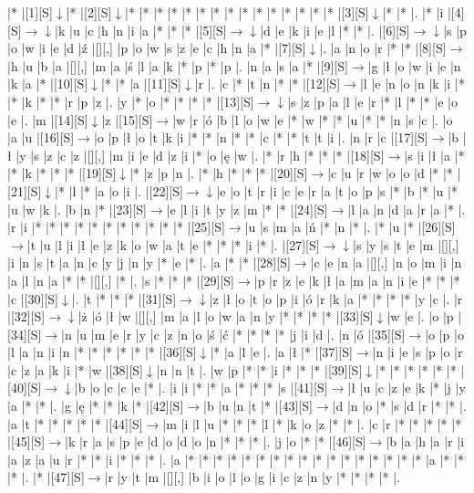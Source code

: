 \documentclass[11pt]{article}
\newcommand\drarr{$\rightarrow \!\!\!\!\! \downarrow$}
\newcommand\rarr{$\rightarrow$}
\newcommand\darr{$\downarrow$}
\begin{document}
\noindent\begin{Puzzle}{21}{31}|*	|[1][S]\darr	|*	|[2][S]\darr	|*	|*	|*	|*	|*	|*	|*	|*	|*	|*	|*	|*	|*	|*	|*	|[3][S]\darr	|*	|*	|.
|*	|i	|[4][S]\drarr	|k	|u	|c	|h	|n	|i	|a	|*	|*	|*	|[5][S]\drarr	|d	|e	|k	|i	|e	|l	|*	|*	|.
|[6][S]\drarr	|s	|p	|o	|w	|i	|e	|d	|ź	|[][,]{ }	|p	|o	|w	|s	|z	|e	|c	|h	|n	|a	|*	|[7][S]\darr	|.
|a	|n	|o	|r	|*	|*	|[8][S]\rarr	|h	|u	|b	|a	|[][,]{ }	|m	|a	|ś	|l	|a	|k	|*	|p	|*	|p	|.
|n	|a	|s	|a	|*	|[9][S]\rarr	|g	|ł	|o	|w	|i	|e	|n	|k	|a	|*	|[10][S]\darr	|*	|*	|a	|[11][S]\darr	|r	|.
|c	|*	|t	|n	|*	|*	|[12][S]\rarr	|l	|e	|n	|o	|n	|k	|i	|*	|*	|k	|*	|*	|r	|p	|z	|.
|y	|*	|o	|*	|*	|*	|*	|[13][S]\drarr	|s	|z	|p	|a	|l	|e	|r	|*	|l	|*	|*	|e	|o	|e	|.
|m	|[14][S]\darr	|z	|[15][S]\rarr	|w	|r	|ó	|b	|l	|o	|w	|e	|*	|w	|*	|*	|u	|*	|*	|n	|s	|c	|.
|o	|a	|u	|[16][S]\rarr	|o	|p	|ł	|o	|t	|k	|i	|*	|*	|n	|*	|*	|c	|*	|*	|t	|t	|i	|.
|n	|r	|c	|[17][S]\rarr	|b	|ł	|y	|s	|z	|c	|z	|[][,]{ }	|m	|i	|e	|d	|z	|i	|*	|o	|ę	|w	|.
|*	|r	|h	|*	|*	|*	|[18][S]\rarr	|s	|i	|ł	|a	|*	|*	|k	|*	|*	|*	|[19][S]\darr	|*	|z	|p	|n	|.
|*	|h	|*	|*	|*	|[20][S]\rarr	|c	|u	|r	|w	|o	|o	|d	|*	|*	|[21][S]\darr	|*	|l	|*	|a	|o	|i	|.
|[22][S]\drarr	|e	|o	|t	|r	|i	|c	|e	|r	|a	|t	|o	|p	|s	|*	|b	|*	|u	|*	|u	|w	|k	|.
|b	|n	|*	|[23][S]\rarr	|e	|l	|i	|t	|y	|z	|m	|*	|*	|[24][S]\rarr	|l	|a	|n	|d	|a	|r	|a	|*	|.
|r	|i	|*	|*	|*	|*	|*	|*	|*	|*	|*	|*	|*	|[25][S]\rarr	|u	|s	|m	|a	|ń	|*	|n	|*	|.
|*	|u	|*	|[26][S]\rarr	|t	|u	|l	|i	|ł	|e	|z	|k	|o	|w	|a	|t	|e	|*	|*	|*	|i	|*	|.
|[27][S]\drarr	|s	|y	|s	|t	|e	|m	|[][,]{ }	|i	|n	|s	|t	|a	|n	|c	|y	|j	|n	|y	|*	|e	|*	|.
|a	|*	|*	|[28][S]\rarr	|c	|e	|n	|a	|[][,]{ }	|n	|o	|m	|i	|n	|a	|l	|n	|a	|*	|*	|[][,]{ }	|*	|.
|s	|*	|*	|*	|[29][S]\rarr	|p	|r	|z	|e	|k	|ł	|a	|m	|a	|n	|i	|e	|*	|*	|*	|c	|[30][S]\darr	|.
|t	|*	|*	|*	|[31][S]\drarr	|z	|ł	|o	|t	|o	|p	|i	|ó	|r	|k	|a	|*	|*	|*	|*	|y	|c	|.
|r	|[32][S]\drarr	|ż	|ó	|ł	|w	|[][,]{ }	|m	|a	|l	|o	|w	|a	|n	|y	|*	|*	|*	|*	|[33][S]\darr	|w	|e	|.
|o	|p	|[34][S]\rarr	|n	|u	|m	|e	|r	|y	|c	|z	|n	|o	|ś	|ć	|*	|*	|*	|*	|j	|i	|d	|.
|n	|ó	|[35][S]\rarr	|o	|p	|o	|l	|a	|n	|i	|n	|*	|*	|*	|*	|*	|*	|[36][S]\darr	|*	|a	|l	|e	|.
|a	|ł	|*	|[37][S]\rarr	|n	|i	|e	|s	|p	|o	|r	|c	|z	|a	|k	|i	|*	|w	|[38][S]\darr	|n	|n	|t	|.
|w	|p	|*	|*	|i	|*	|*	|*	|[39][S]\darr	|*	|*	|*	|*	|*	|*	|[40][S]\drarr	|b	|o	|c	|c	|e	|*	|.
|i	|i	|*	|*	|a	|*	|*	|*	|s	|[41][S]\rarr	|ł	|u	|c	|z	|e	|k	|*	|j	|y	|a	|*	|*	|.
|g	|ę	|*	|*	|k	|*	|[42][S]\rarr	|b	|u	|n	|t	|*	|[43][S]\rarr	|d	|n	|o	|*	|s	|d	|r	|*	|*	|.
|a	|t	|*	|*	|*	|*	|*	|[44][S]\rarr	|m	|i	|l	|u	|*	|*	|*	|l	|*	|k	|o	|z	|*	|*	|.
|c	|r	|*	|*	|*	|*	|*	|[45][S]\rarr	|k	|r	|a	|s	|p	|e	|d	|o	|d	|o	|n	|*	|*	|*	|.
|j	|o	|*	|*	|[46][S]\rarr	|b	|a	|h	|a	|r	|i	|a	|z	|a	|u	|r	|*	|*	|i	|*	|*	|*	|.
|a	|*	|*	|*	|*	|*	|*	|*	|*	|*	|*	|*	|*	|*	|*	|*	|*	|*	|a	|*	|*	|*	|.
|*	|[47][S]\rarr	|r	|y	|t	|m	|[][,]{ }	|b	|i	|o	|l	|o	|g	|i	|c	|z	|n	|y	|*	|*	|*	|*	|.\end{Puzzle}
\end{document}
